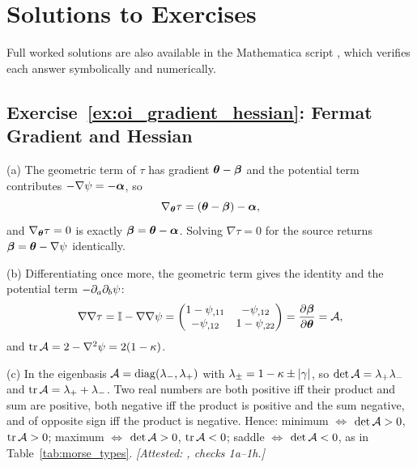 
\section{Solutions to Exercises}
\label{sec:oi_solutions}

\noindent
Full worked solutions are also available in the Mathematica script
,
which verifies each answer symbolically and numerically.

\subsection*{Exercise~\ref{ex:oi_gradient_hessian}: Fermat Gradient and Hessian}

(a) The geometric term of $\tau$ has gradient
$\boldsymbol{\theta}-\boldsymbol{\beta}$ and the potential term contributes
$-\nabla\psi=-\boldsymbol{\alpha}$, so
\[
  \nabla_{\boldsymbol{\theta}}\tau = (\boldsymbol{\theta}-\boldsymbol{\beta})-\boldsymbol{\alpha} ,
\]
and $\nabla_{\boldsymbol{\theta}}\tau=0$ is exactly $\boldsymbol{\beta}=\boldsymbol{\theta}-\boldsymbol{\alpha}$.
Solving $\nabla\tau=0$ for the source returns
$\boldsymbol{\beta}=\boldsymbol{\theta}-\nabla\psi$ identically.

(b) Differentiating once more, the geometric term gives the
identity and the potential term $-\partial_a\partial_b\psi$:
\[
  \nabla\nabla\tau = \mathbb{I}-\nabla\nabla\psi
  = \begin{pmatrix}1-\psi_{,11} & -\psi_{,12}\\ -\psi_{,12} & 1-\psi_{,22}\end{pmatrix}
  = \frac{\partial \boldsymbol{\beta}}{\partial \boldsymbol{\theta}} = \mathcal{A} ,
\]
and $\operatorname{tr}\mathcal{A} = 2-\nabla^2\psi = 2(1-\kappa)$.

(c) In the eigenbasis $\mathcal{A}=\operatorname{diag}(\lambda_-,\lambda_+)$
with $\lambda_\pm=1-\kappa\pm|\gamma|$, so
$\det\mathcal{A}=\lambda_+\lambda_-$ and $\operatorname{tr}\mathcal{A}=\lambda_++\lambda_-$.
Two real numbers are both positive iff their product and sum are
positive, both negative iff the product is positive and the sum
negative, and of opposite sign iff the product is negative.  Hence:
minimum $\Leftrightarrow$ $\det\mathcal{A}>0$, $\operatorname{tr}\mathcal{A}>0$;
maximum $\Leftrightarrow$ $\det\mathcal{A}>0$, $\operatorname{tr}\mathcal{A}<0$;
saddle $\Leftrightarrow$ $\det\mathcal{A}<0$, as in Table~\ref{tab:morse_types}.
\emph{[Attested: , checks 1a--1h.]}

